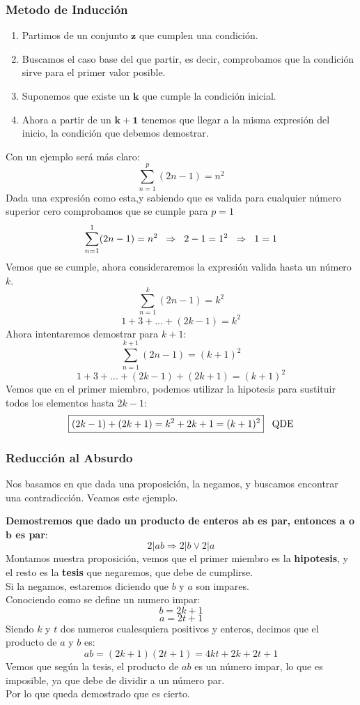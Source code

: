 \subsubsection{Metodo de Inducción}
\begin{enumerate}
        \item Partimos de un conjunto \(\mathbf{z}\) que cumplen una condición.
        \item Buscamos el caso base del que partir, es decir, comprobamos que la condición sirve para el primer valor posible.
        \item Suponemos que existe un \(\mathbf{k}\) que cumple la condición inicial.
        \item Ahora a partir de un \(\mathbf{k+1}\) tenemos que llegar a la misma expresión del inicio, la condición que debemos demostrar.
\end{enumerate}
\noindent Con un ejemplo será más claro:
\[
        \sum^{p}_{n=1}(2n-1) = n^2
\]
\noindent Dada una expresión como esta,y sabiendo que es valida para cualquier número superior cero comprobamos que se cumple para \(p = 1\)
\[
        \sum^{1}_{n=1}(2n-1) = n^2\hspace{2mm}\Rightarrow \hspace{2mm} 2- 1 = 1^2 \hspace{2mm}\Rightarrow \hspace{2mm} 1 = 1
\]
\noindent Vemos que se cumple, ahora consideraremos la expresión valida hasta un número \(k\).
\[
        \sum^{k}_{n=1}(2n-1) = k^2
\]
\[
        1 + 3 + ... + (2k-1) = k^2
\]
\noindent Ahora intentaremos demostrar para \(k +1 \):
\[
        \sum^{k+1}_{n=1}(2n-1) = (k+1)^2
\]
\[
        1 + 3 + ... + (2k-1) + (2k + 1) = (k+1)^2
\]
\noindent Vemos que en el primer miembro, podemos utilizar la hipotesis para sustituir todos los elementos hasta \(2k -1\):
\[
        \boxed{(2k-1) + (2k + 1) = k^2 + 2k +1 = (k+1)^2} \hspace{3mm}\textnormal{QDE}
\]
\subsubsection{Reducción al Absurdo}
\noindent Nos basamos en que dada una proposición, la negamos, y buscamos encontrar una contradicción. Veamos este ejemplo.\par
\noindent \textbf{Demostremos que dado un producto de enteros \(\mathbf{ab}\) es par, entonces \(\mathbf{a}\) o \(\mathbf{b}\) es par}:
\[
        2|ab \Rightarrow 2|b \lor 2|a
\]
\noindent Montamos nuestra proposición, vemos que el primer miembro es la \textbf{hipotesis}, y el resto es la \textbf{tesis} que negaremos, que debe de cumplirse.
\\ Si la negamos, estaremos diciendo que \(b\) y \(a\) son impares. \\Conociendo como se define un numero impar:
\[
        \boxed{b = 2k + 1}
\]
\[
        \boxed{a = 2t + 1}
\]
\noindent Siendo \(k\) y \(t\) dos numeros cualesquiera positivos y enteros, decimos que el producto de \(a\) y \(b\) es:
\[
        \boxed{ab = (2k+1)(2t+1) = 4kt + 2k +2t+1}
\]
\noindent Vemos que según la tesis, el producto de \(ab\) es un número impar, lo que es imposible, ya que debe de dividir a un número par. \\ Por lo que queda demostrado que es cierto.
